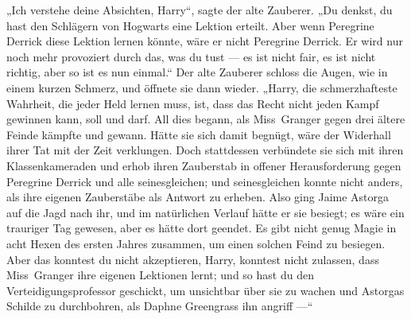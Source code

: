 „Ich verstehe deine Absichten, Harry“, sagte der alte Zauberer.
„Du denkst, du hast den Schlägern von Hogwarts eine Lektion erteilt. Aber wenn Peregrine Derrick diese Lektion lernen könnte, wäre er nicht Peregrine Derrick. Er wird nur noch mehr provoziert durch das, was du tust — es ist nicht fair, es ist nicht richtig, aber so ist es nun einmal.“ Der alte Zauberer schloss die Augen, wie in einem kurzen Schmerz, und öffnete sie dann wieder.
„Harry, die schmerzhafteste Wahrheit, die jeder Held lernen muss, ist, dass das Recht nicht jeden Kampf gewinnen kann, soll und darf. All dies begann, als Miss~Granger gegen drei ältere Feinde kämpfte und gewann. Hätte sie sich damit begnügt, wäre der Widerhall ihrer Tat mit der Zeit verklungen. Doch stattdessen verbündete sie sich mit ihren Klassenkameraden und erhob ihren Zauberstab in offener Herausforderung gegen Peregrine Derrick und alle seinesgleichen; und seinesgleichen konnte nicht anders, als ihre eigenen Zauberstäbe als Antwort zu erheben. Also ging Jaime Astorga auf die Jagd nach ihr, und im natürlichen Verlauf hätte er sie besiegt; es wäre ein trauriger Tag gewesen, aber es hätte dort geendet. Es gibt nicht genug Magie in acht Hexen des ersten Jahres zusammen, um einen solchen Feind zu besiegen. Aber das konntest du nicht akzeptieren, Harry, konntest nicht zulassen, dass Miss~Granger ihre eigenen Lektionen lernt; und so hast du den Verteidigungsprofessor geschickt, um unsichtbar über sie zu wachen und Astorgas Schilde zu durchbohren, als Daphne Greengrass ihn angriff —“

